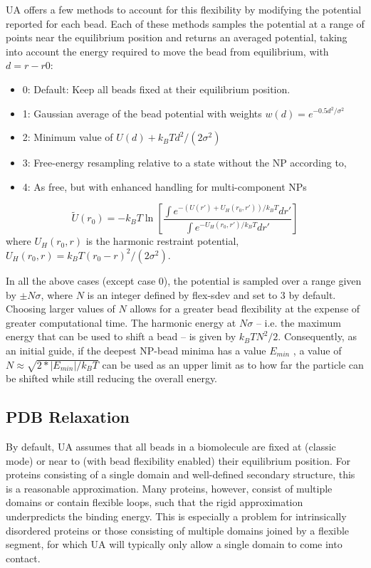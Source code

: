 \documentclass[10pt,a4paper,onecolumn]{report}
\begin{document}
UA offers a few methods to account for this flexibility by modifying the potential reported for each bead. Each of these methods samples the potential at a range of points near the equilibrium position and returns an averaged potential, taking into account the energy required to move the bead from equilibrium, with $d = r-r0$: 
\begin{itemize}
\item 0: Default: Keep all beads fixed at their equilibrium position.
\item 1: Gaussian average of the bead potential with weights $w(d) = e^{-0.5 d^2/\sigma^2}$
\item 2: Minimum value of $U(d) + k_B T d^2/(2 \sigma^2)$
\item 3: Free-energy resampling relative to a state without the NP according to,
\item 4: As free, but with enhanced handling for multi-component NPs
\end{itemize}
\begin{equation}
\tilde{U}(r_0) = -k_B T \ln \left[ \frac{\int e^{-(U(r') + U_H(r_0,r') )/k_BT} dr'}{\int e^{-U_H(r_0,r')/k_BT} dr'} \right]
\end{equation}
where $U_H(r_0,r)$ is the harmonic restraint potential, $U_H(r_0,r) = k_BT (r_0 - r)^2/(2 \sigma^2)$.  

In all the above cases (except case 0), the potential is sampled over a range given by $\pm N \sigma$, where $N$ is an integer defined by flex-sdev and set to $3$ by default. Choosing larger values of $N$ allows for a greater bead flexibility at the expense of greater computational time. The harmonic energy at $N \sigma$ -- i.e. the maximum energy that can be used to shift a bead -- is given by $k_B T N^2 / 2$. Consequently, as an initial guide, if the deepest NP-bead minima has a value $E_{min}$ , a value of $N  \approx \sqrt{ 2*| E_{min} |/k_B T } $ can be used as an upper limit as to how far the particle can be shifted while still reducing the overall energy. 

\subsection{PDB Relaxation}
By default, UA assumes that all beads in a biomolecule are fixed at (classic mode) or near to (with bead flexibility enabled) their equilibrium position. For proteins consisting of a single domain and well-defined secondary structure, this is a reasonable approximation. 
Many proteins, however, consist of multiple domains or contain flexible loops, such that the rigid approximation underpredicts the binding energy. This is especially a problem for intrinsically disordered proteins or those consisting of multiple domains joined by a flexible segment, for which UA will typically only allow a single domain to come into contact.
\end{document}
